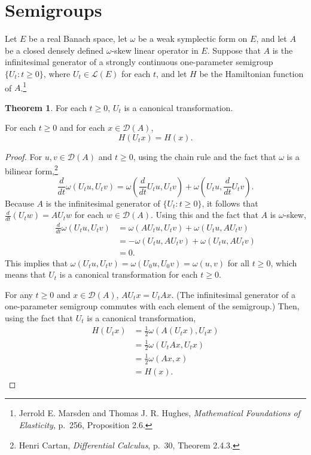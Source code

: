 \documentclass{article}
\theoremstyle{definition}
\newtheorem{theorem}{Theorem}
\theoremstyle{definition}
\begin{document}
\section{Semigroups}
Let $E$ be a real Banach space, let $\omega$ be a weak symplectic form on $E$, and let
$A$ be a closed densely defined $\omega$-skew linear operator in $E$.
Suppose that $A$ is the infinitesimal generator of a strongly continuous one-parameter semigroup $\{U_t: t \geq 0\}$, where
$U_t \in \mathscr{L}(E)$ for each $t$, and let
$H$ be the Hamiltonian function of $A$.\footnote{Jerrold E. Marsden and Thomas J. R. Hughes, {\em Mathematical Foundations of Elasticity}, p.~256, Proposition 2.6.}

\begin{theorem}
For each $t \geq 0$, $U_t$ is a canonical transformation.

For each $t \geq 0$ and for each $x \in \mathscr{D}(A)$,
\[
H(U_t x) = H(x).
\]
\label{flow}
\end{theorem}
\begin{proof}
For $u,v \in \mathscr{D}(A)$ and $t \geq 0$, using the chain rule and the fact that $\omega$ is a bilinear form,\footnote{Henri Cartan,
{\em Differential Calculus}, p.~30, Theorem 2.4.3.}
\[
\frac{d}{dt} \omega(U_t u,U_tv)=\omega\left(\frac{d}{dt} U_t u, U_tv \right)
+\omega\left(U_t u,\frac{d}{dt}U_tv\right).
\]
Because $A$ is the infinitesimal generator of $\{U_t: t \geq 0\}$, it follows
that $\frac{d}{dt}(U_t w) = AU_t w$ for each $w \in \mathscr{D}(A)$. Using this and the fact
that $A$ is $\omega$-skew,
\begin{align*}
\frac{d}{dt} \omega(U_t u,U_tv)&=\omega(AU_tu,U_tv)+\omega(U_tu,AU_tv)\\
&=-\omega(U_tu,AU_tv)+\omega(U_tu,AU_tv)\\
&=0.
\end{align*}
This implies that $\omega(U_t u,U_tv) = \omega(U_0 u, U_0 v)=\omega(u,v)$ for all $t \geq 0$, which means
that $U_t$ is a canonical transformation for each $t \geq 0$. 

For any $t \geq 0$ and $x \in \mathscr{D}(A)$, $AU_t x= U_t A x$. 
(The infinitesimal generator of a one-parameter semigroup commutes with each element of the semigroup.)
Then, using the fact that $U_t$ is a canonical transformation,
\begin{align*}
H(U_t x)&=\frac{1}{2}\omega(A(U_t x),U_t x)\\
&=\frac{1}{2}\omega(U_t Ax,U_tx)\\
&=\frac{1}{2}\omega(Ax,x)\\
&=H(x).
\end{align*}
\end{proof}
\end{document}
